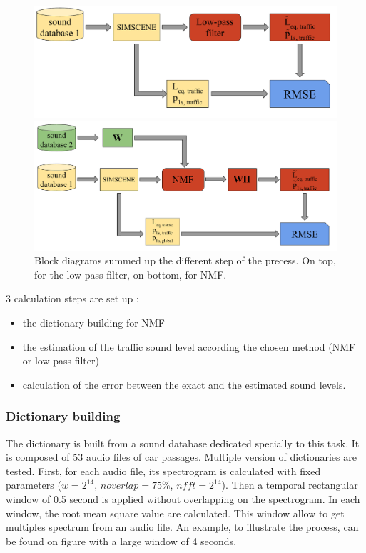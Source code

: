 \documentclass[twocolumn,a4paper,10pt]{article}
\begin{document}
\begin{figure}[!t]
\centering
	\begin{minipage}[t]{.48\textwidth}
		\centering
		\includegraphics[width=.9\linewidth]{../image/bloc_diagram_filtrage_EN.pdf} 
	\end{minipage}
	\begin{minipage}[t]{.48\textwidth}
		\centering
		\includegraphics[width=.9\linewidth]{../image/bloc_diagram_NMF_EN.pdf} 
	\end{minipage}
	\caption{Block diagrams summed up the different step of the precess. On top, for the low-pass filter, on bottom, for NMF.}
	\label{fig:block_diagram_protocol}
\end{figure}

3 calculation steps are set up : 
\begin{itemize}
\item the dictionary building for NMF
\item the estimation of the traffic sound level according the chosen method (NMF or low-pass filter)
\item calculation of the error between the exact and the estimated sound levels.\\
\end{itemize}

\subsubsection{Dictionary building}

The dictionary is built from a sound database dedicated specially to this task. It is composed of 53 audio files of car passages. Multiple version of dictionaries are tested. First, for each audio file, its spectrogram is calculated with fixed parameters ($w = 2^{14}$, $noverlap = 75 \%$, $nfft = 2^{14}$). Then a temporal rectangular window of 0.5 second is applied without overlapping on the spectrogram. In each window, the root mean square value are calculated. This window allow to get multiples spectrum from an audio file.  An example, to illustrate the process, can be found on figure with a large window of 4 seconds. 
\end{document}
